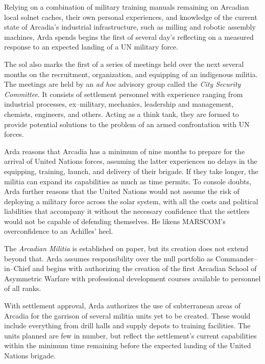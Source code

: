 Relying on a combination of military training manuals remaining on Arcadian local solnet caches, their own personal experiences, and knowledge of the current state of Arcadia's industrial infrastructure, such as milling and robotic assembly machines, Arda spends begins the first of several day's reflecting on a measured response to an expected landing of a UN military force. 

The sol also marks the first of a series of meetings held over the next several months on the recruitment, organization, and equipping of an indigenous militia. The meetings are held by an {\it ad hoc} advisory group called the {\it City Security Committee}. It consists of settlement personnel with experience ranging from industrial processes, ex--military, mechanics, leadership and management, chemists, engineers, and others. Acting as a think tank, they are formed to provide potential solutions to the problem of an armed confrontation with UN forces.

Arda reasons that Arcadia has a minimum of nine months to prepare for the arrival of United Nations forces, assuming the latter experiences no delays in the equipping, training, launch, and delivery of their brigade. If they take longer, the militia can expand its capabilities as much as time permits. To console doubts, Arda further reasons that the United Nations would not assume the risk of deploying a military force across the solar system, with all the costs and political liabilities that accompany it without the necessary confidence that the settlers would not be capable of defending themselves. He likens MARSCOM's overconfidence to an Achilles' heel.

The {\it Arcadian Militia} is established on paper, but its creation does not extend beyond that. Arda assumes responsibility over the null portfolio as Commander--in--Chief and begins with authorizing the creation of the first Arcadian School of Asymmetric Warfare with professional development courses available to personnel of all ranks.
\StopTimelineDate

With settlement approval, Arda authorizes the use of subterranean areas of Arcadia for the garrison of several militia units yet to be created. These would include everything from drill halls and supply depots to training facilities. The units planned are few in number, but reflect the settlement's current capabilities within the minimum time remaining before the expected landing of the United Nations brigade.

